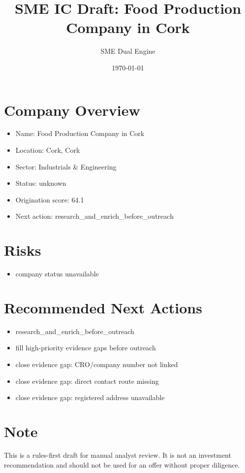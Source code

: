\documentclass[11pt,a4paper]{article}
\title{SME IC Draft: Food Production Company in Cork}
\author{SME Dual Engine}
\date{\today}
\begin{document}
\maketitle
\section*{Company Overview}
\begin{itemize}[leftmargin=1.4em]
\item Name: Food Production Company in Cork
\item Location: Cork, Cork
\item Sector: Industrials \& Engineering
\item Status: unknown
\item Origination score: 64.1
\item Next action: research\_and\_enrich\_before\_outreach
\end{itemize}
\section*{Risks}
\begin{itemize}[leftmargin=1.4em]
\item company status unavailable
\end{itemize}
\section*{Recommended Next Actions}
\begin{itemize}[leftmargin=1.4em]
\item research\_and\_enrich\_before\_outreach
\item fill high-priority evidence gaps before outreach
\item close evidence gap: CRO/company number not linked
\item close evidence gap: direct contact route missing
\item close evidence gap: registered address unavailable
\end{itemize}
\section*{Note}
This is a rules-first draft for manual analyst review. It is not an investment
recommendation and should not be used for an offer without proper diligence.
\end{document}
